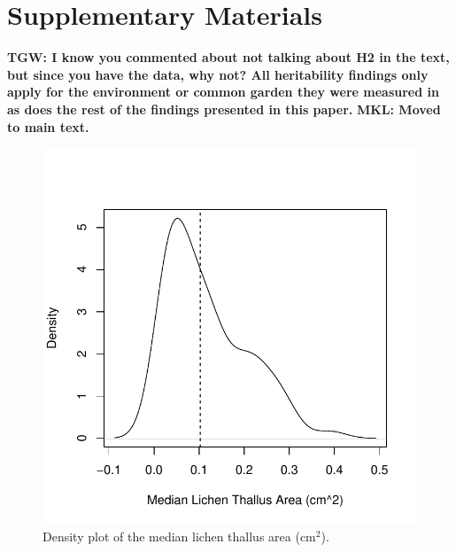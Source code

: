 \documentclass[11pt,twocolumn,twoside,lineno]{pnas-new}
\begin{document}
\showacknow{} %



\newpage

\section*{Supplementary Materials}

\textbf{TGW: I know you commented about not talking about H2 in the
  text, but since you have the data, why not?  All heritability
  findings only apply for the environment or common garden they were
  measured in as does the rest of the findings presented in this
  paper.}
\textbf{MKL: Moved to main text.}

\setcounter{figure}{0}
\setcounter{table}{0}

\begin{figure}[ht]
\centering
\includegraphics[width=\linewidth]{supplement/xg_size.pdf}
\caption{Density plot of the median lichen thallus area (cm$^2$). }
\label{fig:SI_xg_median}
\end{figure}

 
\end{document}
